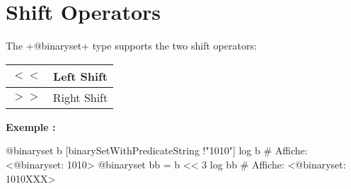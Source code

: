 \section{Shift Operators}

The \ggst+@binaryset+ type supports the two shift operators:\newline

\begin{tabular}{|c|c|}
\hline
$<<$ & Left Shift \\
\hline
$>>$ & Right Shift \\
\hline
\end{tabular}

\textbf{Exemple :}
\begin{galgas3}
@binaryset b [binarySetWithPredicateString !"1010"]
log b # Affiche: <@binaryset: 1010>
@binaryset bb = b << 3
log bb # Affiche: <@binaryset: 1010XXX>
\end{galgas3}

